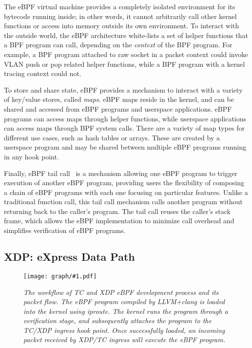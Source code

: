\documentclass[10pt,numbers,reprint]{sigplanconf}
\newcommand{\myfig}[3]
 {
 \begin{figure}
 \centerline{\texttt{[image: graph/\#1.pdf]}}
 \caption{\sl \small #3}
 \label{#1:fig}
 \vspace*{-0.15in}
 \end{figure}
 }
\begin{document}
The eBPF virtual machine provides a completely isolated environment for its
bytecode running inside; in other words, it cannot arbitrarily call other
kernel functions or access into memory outside its own environment. To interact
with the outside world, the eBPF architecture white-lists a set of helper
functions that a BPF program can call, depending on the {\em context} of the
BPF program.  For example, a BPF program attached to raw socket in a packet
context could invoke VLAN push or pop related helper functions, while a BPF
program with a kernel tracing context could not. %

To store and share state, eBPF provides a mechanism to interact with a variety
of key/value stores, called \textit{maps}. eBPF maps reside in the kernel, and can be
shared and accessed from eBPF programs and userspace applications. eBPF
programs can access maps through helper functions, while userspace applications
can access maps through BPF system calls. There are a variety of map types for
different use cases, such as hash tables or arrays. These are created by a
userspace program and may be shared between multiple eBPF programs running in
any hook point.

Finally, eBPF tail call~\cite{tailcall} is a mechanism allowing one eBPF program to trigger execution of 
another eBPF program, providing users the flexibility of composing a chain of
eBPF programs with each one focusing on particular features.  Unlike a
traditional function call, this tail call mechanism calls another program
without returning back to the caller's program. The tail call reuses the
caller's stack frame, which allows the eBPF implementation to minimize call
overhead and simplifies verification of eBPF programs.

\subsection{XDP: eXpress Data Path}
\myfig{tcebpf}{2.6in}{The workflow of TC and XDP eBPF development process and its
packet flow.  The eBPF program compiled by LLVM+clang is loaded into the kernel
using iproute. The kernel runs the program through a verification stage, and
subsequently attaches the program to the TC/XDP ingress hook point.  Once
successfully loaded, an incoming packet received by XDP/TC ingress will execute the
eBPF program.}
\end{document}
